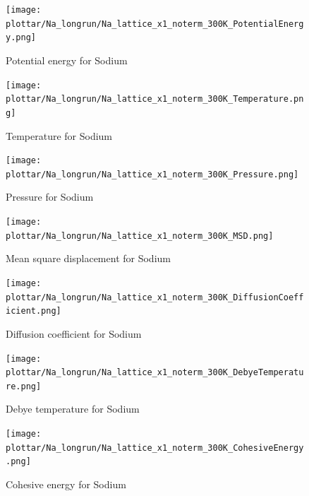 \documentclass[12pt,a4paper]{article}
\begin{document}
\begin{center}
\newpage
\begin{figure}
	\texttt{[image: plottar/Na\_longrun/Na\_lattice\_x1\_noterm\_300K\_PotentialEnergy.png]}
	\caption{Potential energy for Sodium}
	\label{fig:Na_Epot}
\end{figure}

\newpage
\begin{figure}
	\texttt{[image: plottar/Na\_longrun/Na\_lattice\_x1\_noterm\_300K\_Temperature.png]}
	\caption{Temperature for Sodium}
	\label{fig:Na_Temp}
\end{figure}

\newpage
\begin{figure}
	\texttt{[image: plottar/Na\_longrun/Na\_lattice\_x1\_noterm\_300K\_Pressure.png]}
	\caption{Pressure for Sodium}
	\label{fig:Na_Pressure}
\end{figure}

\newpage
\begin{figure}
	\texttt{[image: plottar/Na\_longrun/Na\_lattice\_x1\_noterm\_300K\_MSD.png]}
	\caption{Mean square displacement for Sodium}
	\label{fig:Na_MSD}
\end{figure}

\newpage
\begin{figure}
	\texttt{[image: plottar/Na\_longrun/Na\_lattice\_x1\_noterm\_300K\_DiffusionCoefficient.png]}
	\caption{Diffusion coefficient for Sodium}
	\label{fig:Na_DiffusionCoeff}
\end{figure}

\newpage
\begin{figure}
	\texttt{[image: plottar/Na\_longrun/Na\_lattice\_x1\_noterm\_300K\_DebyeTemperature.png]}
	\caption{Debye temperature for Sodium}
	\label{fig:Na_Debye}
\end{figure}

\newpage
\begin{figure}
	\texttt{[image: plottar/Na\_longrun/Na\_lattice\_x1\_noterm\_300K\_CohesiveEnergy.png]}
	\caption{Cohesive energy for Sodium}
	\label{fig:Na_Ecoh}
\end{figure}

\end{center}
\end{document}
